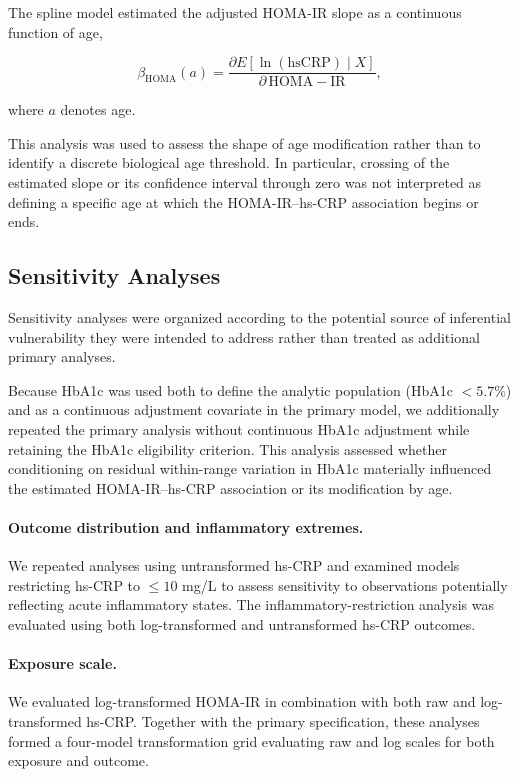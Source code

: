 \documentclass[11pt]{article}
\begin{document}
The spline model estimated the adjusted HOMA-IR slope as a continuous
function of age,

\[
\beta_{\mathrm{HOMA}}(a)
=
\frac{
\partial E[\ln(\mathrm{hsCRP})\mid X]
}{
\partial\,\mathrm{HOMA\!-\!IR}
},
\]

where $a$ denotes age.

This analysis was used to assess the shape of age modification rather than
to identify a discrete biological age threshold. In particular, crossing of
the estimated slope or its confidence interval through zero was not
interpreted as defining a specific age at which the HOMA-IR--hs-CRP
association begins or ends.


\subsection{Sensitivity Analyses}

Sensitivity analyses were organized according to the potential source of
inferential vulnerability they were intended to address rather than treated
as additional primary analyses.

Because HbA1c was used both to define the analytic population
(HbA1c $<5.7\%$) and as a continuous adjustment covariate in the primary
model, we additionally repeated the primary analysis without continuous
HbA1c adjustment while retaining the HbA1c eligibility criterion. This
analysis assessed whether conditioning on residual within-range variation
in HbA1c materially influenced the estimated HOMA-IR--hs-CRP association
or its modification by age.

\paragraph{Outcome distribution and inflammatory extremes.}
We repeated analyses using untransformed hs-CRP and examined models
restricting hs-CRP to $\leq10$ mg/L to assess sensitivity to observations
potentially reflecting acute inflammatory states. The inflammatory-restriction
analysis was evaluated using both log-transformed and untransformed hs-CRP
outcomes.

\paragraph{Exposure scale.}
We evaluated log-transformed HOMA-IR in combination with both raw and
log-transformed hs-CRP. Together with the primary specification, these
analyses formed a four-model transformation grid evaluating raw and log
scales for both exposure and outcome.
\end{document}
